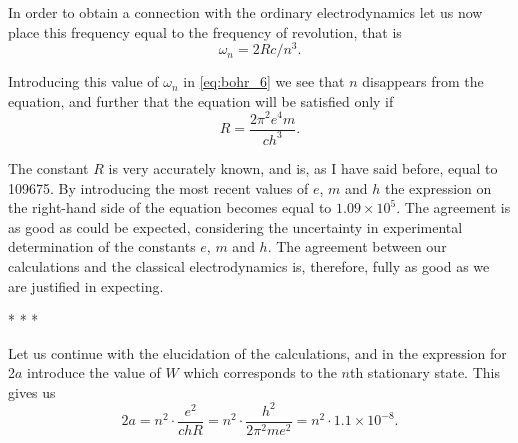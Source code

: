 In order to obtain a connection with the ordinary electrodynamics let us
now place this frequency equal to the frequency of revolution, that is
\begin{equation*}
\omega_n = 2Rc/n^3 .
\end{equation*}

Introducing this value of $\omega_n$ in \eqref{eq:bohr_6} we see that $n$
disappears from the equation, and further that the equation will be
satisfied only if
\begin{equation}\label{eq:bohr_7}
R = \frac{2\pi^2e^4m}{ch^3}.
\end{equation}

The constant $R$ is very accurately known, and is, as I have said
before, equal to 109675. By introducing the most recent values of
$e$, $m$ and $h$ the expression on the right-hand side of
the equation becomes equal to $1.09\!\times\!10^5$. The agreement is as good as
could be expected, considering the uncertainty in experimental
determination of the constants $e$, $m$ and $h$. The
agreement between our calculations and the classical electrodynamics is,
therefore, fully as good as we are justified in expecting.\\
\centerline{* * *}
%
Let us continue with the elucidation of the calculations, and in the
expression for 2$a$ introduce the value of $W$ which
corresponds to the $n$th stationary state. This gives us
\begin{equation}\label{eq:bohr_8}
2a = n^2 \cdot \frac{e^2}{chR} = n^2 \cdot \frac{h^2}{2\pi^2me^2} = n^2 \cdot 1.1\!\times\!10^{-8} .
\end{equation}


